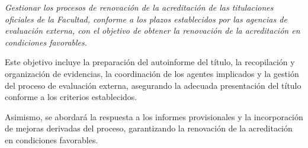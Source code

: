 \documentclass[11pt,a4paper]{scrreprt}
\begin{document}
\newpage
{}
{\small\color{mutedcolor}\itshape Gestionar los procesos de renovación de la acreditación de las titulaciones oficiales de la Facultad, conforme a los plazos establecidos por las agencias de evaluación externa, con el objetivo de obtener la renovación de la acreditación en condiciones favorables. 

Este objetivo incluye la preparación del autoinforme del título, la recopilación y organización de evidencias, la coordinación de los agentes implicados y la gestión del proceso de evaluación externa, asegurando la adecuada presentación del título conforme a los criterios establecidos. 

Asimismo, se abordará la respuesta a los informes provisionales y la incorporación de mejoras derivadas del proceso, garantizando la renovación de la acreditación en condiciones favorables. }\par\vspace{6pt}
\end{document}
